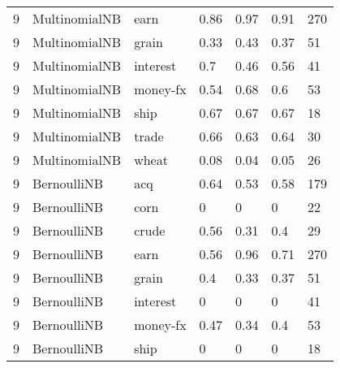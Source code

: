 \documentclass{article}
\begin{document}
\begin{table}[h]
\begin{tabular}{lllllll}
9             & MultinomialNB          & earn            & 0.86               & 0.97            & 0.91              & 270              \\
9             & MultinomialNB          & grain           & 0.33               & 0.43            & 0.37              & 51               \\
9             & MultinomialNB          & interest        & 0.7                & 0.46            & 0.56              & 41               \\
9             & MultinomialNB          & money-fx        & 0.54               & 0.68            & 0.6               & 53               \\
9             & MultinomialNB          & ship            & 0.67               & 0.67            & 0.67              & 18               \\
9             & MultinomialNB          & trade           & 0.66               & 0.63            & 0.64              & 30               \\
9             & MultinomialNB          & wheat           & 0.08               & 0.04            & 0.05              & 26               \\
9             & BernoulliNB            & acq             & 0.64               & 0.53            & 0.58              & 179              \\
9             & BernoulliNB            & corn            & 0                  & 0               & 0                 & 22               \\
9             & BernoulliNB            & crude           & 0.56               & 0.31            & 0.4               & 29               \\
9             & BernoulliNB            & earn            & 0.56               & 0.96            & 0.71              & 270              \\
9             & BernoulliNB            & grain           & 0.4                & 0.33            & 0.37              & 51               \\
9             & BernoulliNB            & interest        & 0                  & 0               & 0                 & 41               \\
9             & BernoulliNB            & money-fx        & 0.47               & 0.34            & 0.4               & 53               \\
9             & BernoulliNB            & ship            & 0                  & 0               & 0                 & 18               \\

\end{tabular}
\end{table}
\end{document}
